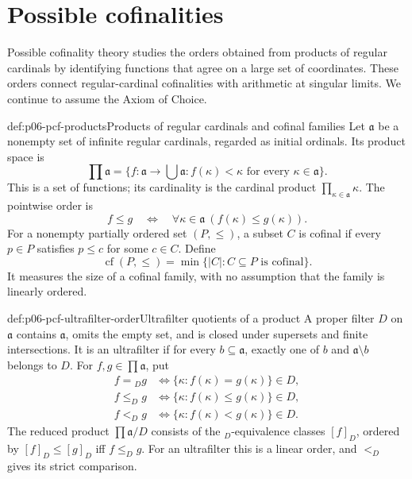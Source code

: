 
\section{Possible cofinalities}
\label{sec:p06-pcf}

Possible cofinality theory studies the orders obtained from products of
regular cardinals by identifying functions that agree on a large set of
coordinates.  These orders connect regular-cardinal cofinalities with
arithmetic at singular limits.  We continue to assume the Axiom of Choice.

\begin{hbdefinition}{def:p06-pcf-products}{Products of regular cardinals and cofinal families}
Let \(\mathfrak a\) be a nonempty set of infinite regular cardinals,
regarded as initial ordinals.  Its product space is
\[
 \prod\mathfrak a
   =\{f:\mathfrak a\to\bigcup\mathfrak a:
                         f(\kappa)<\kappa\text{ for every }\kappa\in\mathfrak a\}.
\]
This is a set of functions; its cardinality is the cardinal product
\(\prod_{\kappa\in\mathfrak a}\kappa\).
The pointwise order is
\[
 f\leq g
 \quad\Longleftrightarrow\quad
 \forall\kappa\in\mathfrak a\ (f(\kappa)\leq g(\kappa)).
\]
For a nonempty partially ordered set \((P,\leq)\), a subset \(C\)
is cofinal if every \(p\in P\) satisfies \(p\leq c\) for some \(c\in C\).
Define
\[
 \operatorname{cf}(P,\leq)
   =\min\{|C|:C\subseteq P\text{ is cofinal}\}.
\]
It measures the size of a cofinal family, with no assumption that
the family is linearly ordered.
\end{hbdefinition}

\begin{hbdefinition}{def:p06-pcf-ultrafilter-order}{Ultrafilter quotients of a product}
A proper filter \(D\) on \(\mathfrak a\) contains \(\mathfrak a\),
omits the empty set, and is closed under supersets and finite
intersections.  It is an ultrafilter if for every
\(b\subseteq\mathfrak a\), exactly one of \(b\) and
\(\mathfrak a\setminus b\) belongs to \(D\).
For \(f,g\in\prod\mathfrak a\), put
\[
\begin{aligned}
 f={}_D g
   &\Longleftrightarrow
       \{\kappa:f(\kappa)=g(\kappa)\}\in D,\\
 f\leq_D g
   &\Longleftrightarrow
       \{\kappa:f(\kappa)\leq g(\kappa)\}\in D,\\
 f<_D g
   &\Longleftrightarrow
       \{\kappa:f(\kappa)<g(\kappa)\}\in D.
\end{aligned}
\]
The reduced product \(\prod\mathfrak a/D\) consists of the
\({}_D\)-equivalence classes \([f]_D\), ordered by
\([f]_D\leq[g]_D\) iff \(f\leq_D g\).
For an ultrafilter this is a linear order, and \(<_D\) gives
its strict comparison.
\end{hbdefinition}

